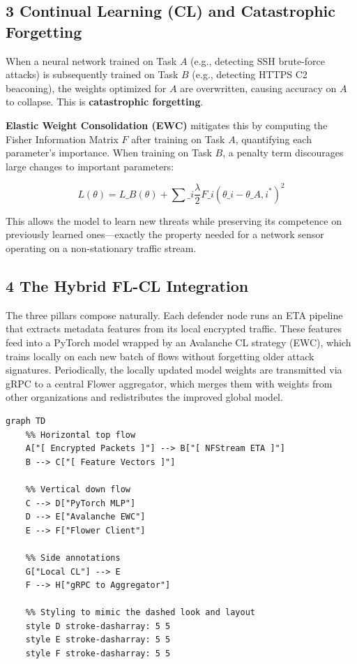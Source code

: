 \documentclass[conference]{IEEEtran}
\begin{document}
\subsection{3 Continual Learning (CL) and Catastrophic Forgetting}

When a neural network trained on Task $A$ (e.g., detecting SSH brute-force attacks) is subsequently trained on Task $B$ (e.g., detecting HTTPS C2 beaconing), the weights optimized for $A$ are overwritten, causing accuracy on $A$ to collapse. This is \textbf{catastrophic forgetting}.

\textbf{Elastic Weight Consolidation (EWC)} mitigates this by computing the Fisher Information Matrix $F$ after training on Task $A$, quantifying each parameter's importance. When training on Task $B$, a penalty term discourages large changes to important parameters:

$$L(\theta) = L\_B(\theta) + \sum\_{i} \frac{\lambda}{2} F\_i (\theta\_i - \theta\_{A,i}^*)^2$$

This allows the model to learn new threats while preserving its competence on previously learned ones—exactly the property needed for a network sensor operating on a non-stationary traffic stream.


\subsection{4 The Hybrid FL-CL Integration}

The three pillars compose naturally. Each defender node runs an ETA pipeline that extracts metadata features from its local encrypted traffic. These features feed into a PyTorch model wrapped by an Avalanche CL strategy (EWC), which trains locally on each new batch of flows without forgetting older attack signatures. Periodically, the locally updated model weights are transmitted via gRPC to a central Flower aggregator, which merges them with weights from other organizations and redistributes the improved global model.

\begin{verbatim}
graph TD
    %% Horizontal top flow
    A["[ Encrypted Packets ]"] --> B["[ NFStream ETA ]"]
    B --> C["[ Feature Vectors ]"]

    %% Vertical down flow
    C --> D["PyTorch MLP"]
    D --> E["Avalanche EWC"]
    E --> F["Flower Client"]

    %% Side annotations
    G["Local CL"] --> E
    F --> H["gRPC to Aggregator"]

    %% Styling to mimic the dashed look and layout
    style D stroke-dasharray: 5 5
    style E stroke-dasharray: 5 5
    style F stroke-dasharray: 5 5
\end{verbatim}
\end{document}
